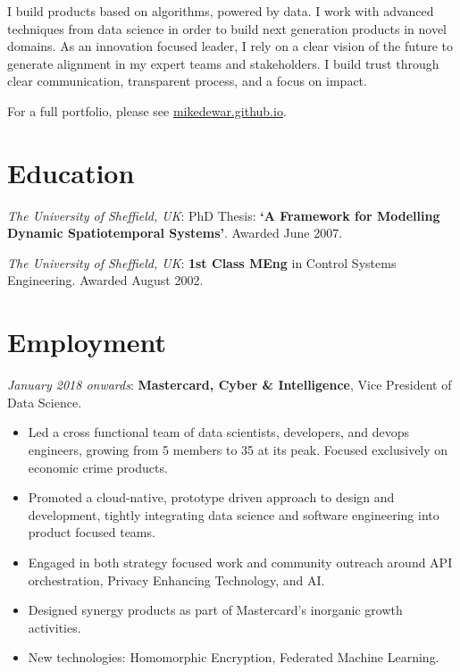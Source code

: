 \documentclass[line, overlapped]{res}
\providecommand{\tightlist}{%
  \setlength{\itemsep}{0pt}\setlength{\parskip}{0pt}}
\begin{document}

\address{
London\\
mikedewar@gmail.com
}

\begin{resume}

I build products based on algorithms, powered by data. I work with advanced techniques from data science in order to build next generation products in novel domains. As an innovation focused leader, I rely on a clear vision of the future to generate alignment in my expert teams and stakeholders.  I build trust through clear communication, transparent process, and a focus on impact.

For a full portfolio, please see \href{https://mikedewar.github.io}{mikedewar.github.io}.

\section{Education}

\emph{The University of Sheffield, UK}: PhD Thesis: \textbf{`A
  Framework for Modelling Dynamic Spatiotemporal Systems'}. Awarded June
  2007. 

\emph{The University of Sheffield, UK}: \textbf{1st Class MEng} in
  Control Systems Engineering. Awarded August 2002.

\section{Employment}

  \emph{January 2018 onwards}: \textbf{Mastercard, Cyber \&
  Intelligence}, Vice President of Data Science.
  \begin{itemize}
  \tightlist
	\item Led a cross functional team of data scientists, developers, and devops engineers, growing from 5 members to 35 at its peak. Focused exclusively on economic crime products. 
	\item Promoted a cloud-native, prototype driven approach to design and development, tightly integrating data science and software engineering into product focused teams.
	\item Engaged in both strategy focused work and community outreach around API orchestration, Privacy Enhancing Technology, and AI.
	\item Designed synergy products as part of Mastercard's inorganic growth activities.
	\item New technologies: Homomorphic Encryption, Federated Machine Learning.
  \end{itemize}


\end{resume}
\end{document}
